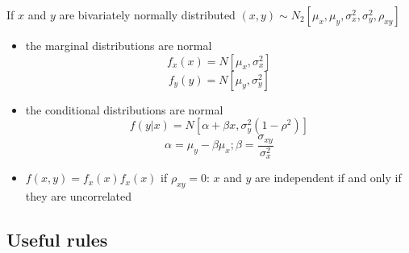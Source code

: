 \documentclass[a4paper,12pt]{article}
\begin{document}
If $x$ and $y$ are bivariately normally distributed $(x,y)\sim N_2[\mu_x,\mu_y,\sigma^2_{x},\sigma^2_{y},\rho_{xy}]$
\begin{itemize}
	\item the marginal distributions are normal $$f_x(x)=N[\mu_x,\sigma_x^2]$$$$f_y(y)=N[\mu_y,\sigma_y^2]$$
	\item the conditional distributions are normal $$f(y|x)=N[\alpha + \beta x, \sigma_y^2(1-\rho^2)]$$ $$\alpha=\mu_y-\beta \mu_x; \beta=\frac{\sigma_{xy}}{\sigma^2_{x}}$$
	\item $f(x,y)=f_x(x)f_x(x)$ if $\rho_{xy}=0$: $x$ and $y$ are independent if and only if they are uncorrelated
\end{itemize}


\subsection{Useful rules}
\end{document}
